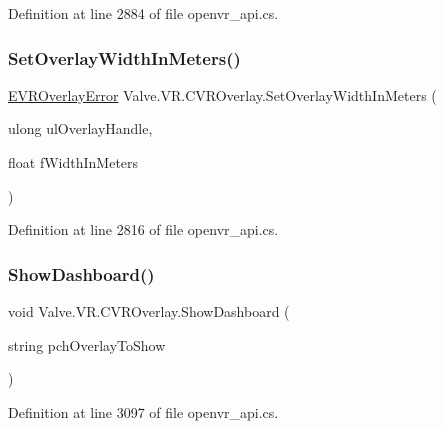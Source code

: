 Definition at line 2884 of file openvr\+\_\+api.\+cs.

\mbox{\label{class_valve_1_1_v_r_1_1_c_v_r_overlay_a7fc09f63d5eb98b12972eb77acea0cd1}} 
\subsubsection{\texorpdfstring{SetOverlayWidthInMeters()}{SetOverlayWidthInMeters()}}
{\footnotesize\ttfamily \mbox{\hyperlink{namespace_valve_1_1_v_r_aaee5c5144f42b7969d45b854f51b0c18}{E\+V\+R\+Overlay\+Error}} Valve.\+V\+R.\+C\+V\+R\+Overlay.\+Set\+Overlay\+Width\+In\+Meters (\begin{DoxyParamCaption}\item[{ulong}]{ul\+Overlay\+Handle,  }\item[{float}]{f\+Width\+In\+Meters }\end{DoxyParamCaption})}



Definition at line 2816 of file openvr\+\_\+api.\+cs.

\mbox{\label{class_valve_1_1_v_r_1_1_c_v_r_overlay_ac731a2fc3a7a6a3fc3bfb949545cf986}} 
\subsubsection{\texorpdfstring{ShowDashboard()}{ShowDashboard()}}
{\footnotesize\ttfamily void Valve.\+V\+R.\+C\+V\+R\+Overlay.\+Show\+Dashboard (\begin{DoxyParamCaption}\item[{string}]{pch\+Overlay\+To\+Show }\end{DoxyParamCaption})}



Definition at line 3097 of file openvr\+\_\+api.\+cs.

\mbox{\label{class_valve_1_1_v_r_1_1_c_v_r_overlay_a1f615d854db640debe761d4d9b43e118}} 
